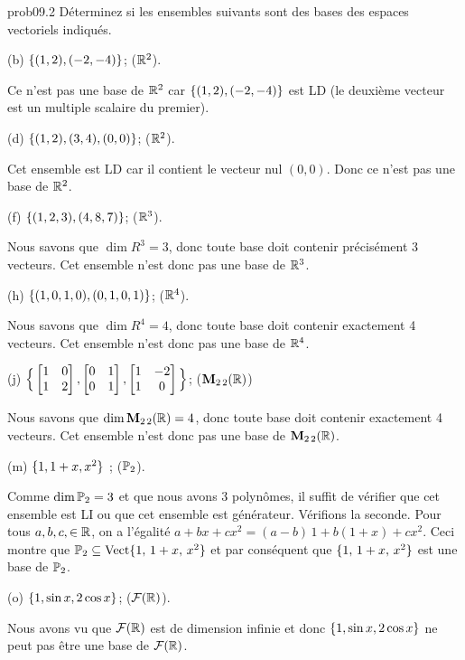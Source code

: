 \bigskip
\begin{sol}{prob09.2} Déterminez si les ensembles suivants sont des bases des espaces vectoriels indiqués.   
  \medskip

(b) $\{(1,2), (-2,-4)\} $; ($\mathbb{R}^2$).

\soln Ce n'est pas une base de $\mathbb{R}^2$ car $\{(1,2), (-2,-4)\} $ est LD (le deuxième vecteur est un multiple scalaire du premier).\medskip


(d) $\{(1,2), (3,4), (0,0)\} $; ($\mathbb{R}^2$).

\soln Cet ensemble est LD car il contient le vecteur nul $(0,0)$. Donc ce n'est pas une base de $\mathbb{R}^2$.\medskip


(f) $\{(1,2,3), (4,8,7)\}$; ($\mathbb{R}^3$).

\soln Nous savons que $\dim R^3=3$, donc toute base doit contenir précisément $3$ vecteurs. Cet ensemble n'est donc pas une base de $\mathbb{R}^3$.\medskip



(h) $\{(1,0,1,0), (0,1,0,1)\}$; ($\mathbb{R}^4$).

\soln Nous savons que $\dim R^4=4$, donc toute base doit contenir exactement 4 vecteurs. Cet ensemble n'est donc pas une base de  $\mathbb{R}^4$.

\medskip



(j)  $\Big\{\bmatrix 1&0\\1&2\endbmatrix, \bmatrix 0&1\\0&1\endbmatrix , \bmatrix 1&-2\\1&0\endbmatrix \Big\}$; ($\mathbf{M}_{2 \,2}(\mathbb{R})$)

\soln Nous savons que $\dim \mathbf{M}_{2 \,2}(\mathbb{R}) =4$, donc toute base doit contenir exactement 4 vecteurs. Cet ensemble n'est donc pas une base de $\mathbf{M}_{2 \,2}(\mathbb{R})$.


\medskip

(m) $\{1, 1+x, x^2\}$ ; ($\mathbb{P}_2$). 

\soln Comme $\dim \mathbb{P}_2=3$ et que nous avons 3 polynômes, il suffit de vérifier que cet ensemble est LI ou que cet ensemble est générateur. Vérifions la seconde. Pour tous $a,b,c,\in \mathbb{R}$, on a l'égalité $a+bx +cx^2= (a-b)\, 1 + b(1+x) +c x^2$. Ceci montre que $\mathbb{P}_2\subseteq\operatorname{ Vect} \normalsize\{1,\, 1+x, \,x^2\normalsize\}$ et par conséquent que $\{1,\, 1+x, \,x^2\}$ est une base de $\mathbb{P}_2$.
\medskip 
 
(o) $\{1, \sin x, 2 \cos x\}$; ($\mathcal{F}(\mathbb{R})$).

\soln Nous avons vu que $\mathcal{F}(\mathbb{R})$ est de dimension infinie et donc $\{1, \sin x, 2 \cos x\}$ ne peut pas être une base de $\mathcal{F}(\mathbb{R})$. 


\end{sol}
